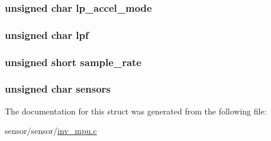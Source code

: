 \subsubsection[{\texorpdfstring{lp\+\_\+accel\+\_\+mode}{lp_accel_mode}}]{\setlength{\rightskip}{0pt plus 5cm}unsigned char lp\+\_\+accel\+\_\+mode}\hypertarget{structchip__cfg__s_aeb8fb45fc306b199be68b3f61940fbb0}{}\label{structchip__cfg__s_aeb8fb45fc306b199be68b3f61940fbb0}
\subsubsection[{\texorpdfstring{lpf}{lpf}}]{\setlength{\rightskip}{0pt plus 5cm}unsigned char lpf}\hypertarget{structchip__cfg__s_a0a4067140c6a3704b4312ba62b77aadb}{}\label{structchip__cfg__s_a0a4067140c6a3704b4312ba62b77aadb}
\subsubsection[{\texorpdfstring{sample\+\_\+rate}{sample_rate}}]{\setlength{\rightskip}{0pt plus 5cm}unsigned short sample\+\_\+rate}\hypertarget{structchip__cfg__s_a1aa4e026c4d2f691506f2d713a405aea}{}\label{structchip__cfg__s_a1aa4e026c4d2f691506f2d713a405aea}
\subsubsection[{\texorpdfstring{sensors}{sensors}}]{\setlength{\rightskip}{0pt plus 5cm}unsigned char sensors}\hypertarget{structchip__cfg__s_aaa21c01566947e7007476657cb614e3f}{}\label{structchip__cfg__s_aaa21c01566947e7007476657cb614e3f}


The documentation for this struct was generated from the following file\+:\begin{DoxyCompactItemize}
\item 
sensor/sensor/\hyperlink{inv__mpu_8c}{inv\+\_\+mpu.\+c}\end{DoxyCompactItemize}
